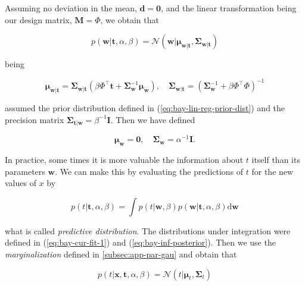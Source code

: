\documentclass[11pt]{article} %
\begin{document}
 Assuming no deviation in the mean, $\mathbf{d} = \mathbf{0}$, and the linear transformation being our design matrix, $\mathbf{M} = \Phi$, we obtain that

 \begin{equation}
   \label{eq:bay-inf-posterior}
    p(\mathbf{w}|\mathbf{t},\alpha,\beta) = \mathcal{N} \left( \mathbf{w} | \boldsymbol{\mu}_{\mathbf{w}|\mathbf{t}} , \boldsymbol{\Sigma}_{\mathbf{w}|\mathbf{t}}\right)
 \end{equation}

 being

 \begin{equation}
   \boldsymbol{\mu}_{\mathbf{w}|\mathbf{t}}=\boldsymbol{\Sigma}_{\mathbf{w}|\mathbf{t}}\left(\beta \Phi^\top \mathbf{t}+\boldsymbol{\Sigma}_{\mathbf{w}}^{-1} \boldsymbol{\mu}_{\mathbf{w}}\right), \quad \boldsymbol{\Sigma}_{\mathbf{w}|\mathbf{t}}=\left(\boldsymbol{\Sigma}_{\mathbf{w}}^{-1}+ \beta \Phi^\top \Phi\right)^{-1}
 \end{equation}

 assumed the prior distribution defined in (\ref{eq:bay-lin-reg-prior-dist}) and the precision matrix $\boldsymbol{\Sigma}_{\mathbf{t}|\mathbf{w}} = \beta^{-1}\mathbf{I}$. Then we have defined

 \begin{equation}
    \boldsymbol{\mu}_\mathbf{w}=\mathbf{0}, \quad \boldsymbol{\Sigma}_\mathbf{w} = \alpha^{-1} \mathbf{I}.
 \end{equation}


 In practice, some times it is more valuable the information about $t$ itself than its parameters $\mathbf{w}$. We can make this by evaluating the predictions of $t$ for the new values of $x$ by

 \begin{equation}
    p(t | \mathbf{t}, \alpha, \beta)=\int p(t | \mathbf{w}, \beta) p(\mathbf{w} | \mathbf{t}, \alpha, \beta) \mathrm{d} \mathbf{w}
 \end{equation}
 
 what is called \textit{predictive distribution}. The distributions under integration were defined in (\ref{eq:bay-cur-fit-1}) and (\ref{eq:bay-inf-posterior}). Then we use the \textit{marginalization} defined in \autoref{subsec:app-par-gau} and obtain that
 
 \begin{equation}
    p(t | \mathbf{x}, \mathbf{t}, \alpha, \beta)=\mathcal{N}\left(t | \boldsymbol{\mu}_{t}, \boldsymbol{\Sigma}_{t} \right)
 \end{equation}
 
\end{document}
